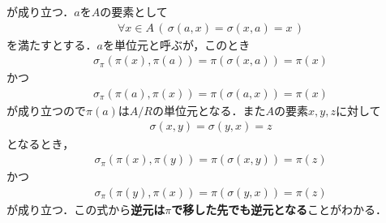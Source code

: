 	が成り立つ．$a$を$A$の要素として
	\begin{align}
		\forall x \in A\, (\, \sigma(a,x) = \sigma(x,a) = x\, )
	\end{align}
	を満たすとする．$a$を単位元と呼ぶが，このとき
	\begin{align}
		\sigma_\pi(\pi(x),\pi(a)) = \pi(\sigma(x,a)) = \pi(x)
	\end{align}
	かつ
	\begin{align}
		\sigma_\pi(\pi(a),\pi(x)) = \pi(\sigma(a,x)) = \pi(x)
	\end{align}
	が成り立つので$\pi(a)$は$A/R$の単位元となる．また$A$の要素$x,y,z$に対して
	\begin{align}
		\sigma(x,y) = \sigma(y,x) = z
	\end{align}
	となるとき，
	\begin{align}
		\sigma_\pi(\pi(x),\pi(y)) = \pi(\sigma(x,y)) = \pi(z)
	\end{align}
	かつ
	\begin{align}
		\sigma_\pi(\pi(y),\pi(x)) = \pi(\sigma(y,x)) = \pi(z)
	\end{align}
	が成り立つ．この式から{\bf 逆元は$\pi$で移した先でも逆元となる}ことがわかる．
	
